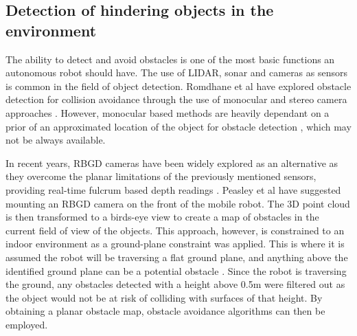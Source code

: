 

\subsection{Detection of hindering objects in the environment}
The ability to detect and avoid obstacles is one of the most basic functions an autonomous robot should have. The use of LIDAR, sonar and cameras as sensors is common in the field of object detection. Romdhane et al have explored obstacle detection for collision avoidance through the use of monocular and stereo camera approaches \cite{BenRomdhane2011}. However, monocular based methods are heavily dependant on a prior of an approximated location of the object for obstacle detection \cite{BenRomdhane2011}, which may not be always available. 

In recent years, RBGD cameras have been widely explored as an alternative as they overcome the planar limitations of the previously mentioned sensors, providing real-time fulcrum based depth readings \cite{Peasley2013}. Peasley et al have suggested mounting an RBGD camera on the front of the mobile robot. The 3D point cloud is then transformed to a birds-eye view to create a map of obstacles in the current field of view of the objects\cite{Peasley2013}. This approach, however, is constrained to an indoor environment as a ground-plane constraint was applied. This is where it is assumed the robot will be traversing a flat ground plane, and anything above the identified ground plane can be a potential obstacle \cite{Peasley2013}. Since the robot is traversing the ground, any obstacles detected with a height above 0.5m were filtered out as the object would not be at risk of colliding with surfaces of that height. By obtaining a planar obstacle map, obstacle avoidance algorithms can then be employed. 

